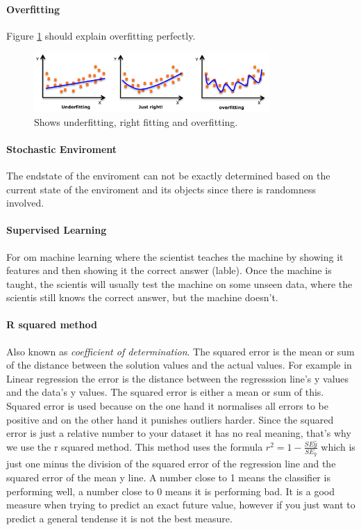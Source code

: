 \paragraph{Overfitting}
Figure \ref{fig:svm-overfitting} should explain overfitting perfectly.

\begin{figure}
\centering
\includegraphics[width=0.8\textwidth]{images/svm-overfitting.png}
\caption{\label{fig:svm-overfitting} Shows underfitting, right fitting and overfitting.}
\end{figure}

\paragraph{Stochastic Enviroment}
The endstate of the enviroment can not be exactly determined based on the current state of the enviroment and its objects since there is randomness involved.

\paragraph{Supervised Learning} 
For om machine learning where the scientist teaches the machine by showing it features and then showing it the correct answer (lable). Once the machine is taught, the scientis will usually test the machine on some unseen data, where the scientis still knows the correct answer, but the machine doesn't.

\paragraph{R squared method}
Also known as \emph{coefficient of determination}. The squared error is the mean or sum of the distance between the solution values and the actual values. For example in Linear regression the error is the distance between the regresssion line's y values and the data's y values. The squared error is either a mean or sum of this. Squared error is used because on the one hand it normalises all errors to be positive and on the other hand it punishes outliers harder. Since the squared error is just a relative number to your dataset it has no real meaning, that's why we use the r squared method. This method uses the formula $r^2 = 1 - \frac{SE\hat{y}}{SE_{\overline{y}}}$ which is just one minus the division of the squared error of the regression line and the squared error of the mean y line. A number close to 1 means the classifier is performing well, a number close to 0 means it is performing bad. It is a good measure when trying to predict an exact future value, however if you just want to predict a general tendense it is not the best measure.

